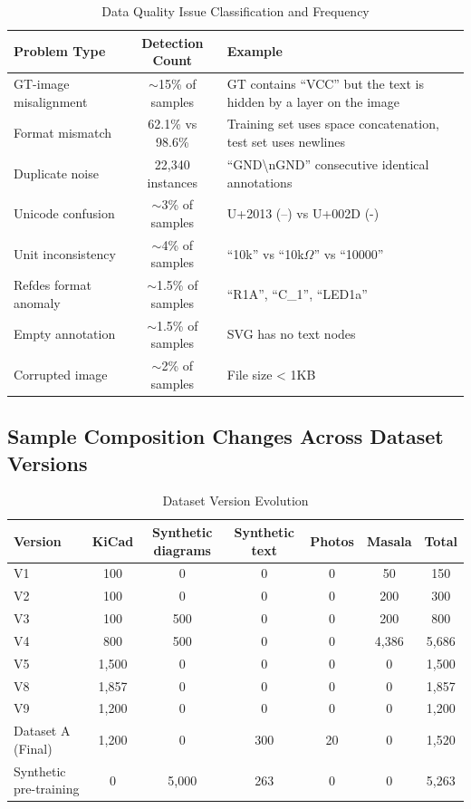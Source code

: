 \begin{table}[h]
\centering
\caption{Data Quality Issue Classification and Frequency}
\scriptsize
\begin{tabular}{lcp{5cm}}
\toprule
\textbf{Problem Type} & \textbf{Detection Count} & \textbf{Example} \\
\midrule
GT-image misalignment & $\sim$15\% of samples & GT contains ``VCC'' but the text is hidden by a layer on the image \\
Format mismatch & 62.1\% vs 98.6\% & Training set uses space concatenation, test set uses newlines \\
Duplicate noise & 22,340 instances & ``GND\textbackslash nGND'' consecutive identical annotations \\
Unicode confusion & $\sim$3\% of samples & U+2013 (--) vs U+002D (-) \\
Unit inconsistency & $\sim$4\% of samples & ``10k'' vs ``10k$\Omega$'' vs ``10000'' \\
Refdes format anomaly & $\sim$1.5\% of samples & ``R1A'', ``C\_1'', ``LED1a'' \\
Empty annotation & $\sim$1.5\% of samples & SVG has no text nodes \\
Corrupted image & $\sim$2\% of samples & File size < 1KB \\
\bottomrule
\end{tabular}
\end{table}

\subsection{Sample Composition Changes Across Dataset Versions}

\begin{table}[h]
\centering
\caption{Dataset Version Evolution}
\scriptsize
\begin{tabular}{lcccccc}
\toprule
\textbf{Version} & \textbf{KiCad} & \textbf{Synthetic diagrams} & \textbf{Synthetic text} & \textbf{Photos} & \textbf{Masala} & \textbf{Total} \\
\midrule
V1 & 100 & 0 & 0 & 0 & 50 & 150 \\
V2 & 100 & 0 & 0 & 0 & 200 & 300 \\
V3 & 100 & 500 & 0 & 0 & 200 & 800 \\
V4 & 800 & 500 & 0 & 0 & 4,386 & 5,686 \\
V5 & 1,500 & 0 & 0 & 0 & 0 & 1,500 \\
V8 & 1,857 & 0 & 0 & 0 & 0 & 1,857 \\
V9 & 1,200 & 0 & 0 & 0 & 0 & 1,200 \\
Dataset A (Final) & 1,200 & 0 & 300 & 20 & 0 & 1,520 \\
Synthetic pre-training & 0 & 5,000 & 263 & 0 & 0 & 5,263 \\
\bottomrule
\end{tabular}
\end{table}

